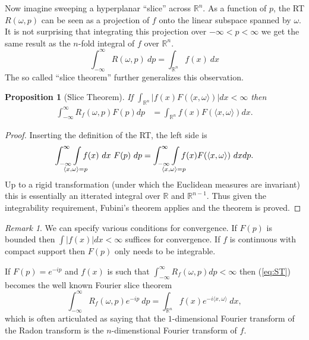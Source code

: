 \documentclass{amsart}
\newtheorem{proposition}[theorem]{Proposition}
\theoremstyle{remark}
\newtheorem{remark}[theorem]{Remark}
\numberwithin{equation}{section}
\newcommand{\RR}{\mathbb{R}}
\def\mclimits_#1{\limits_{\mathclap{#1}}}
\begin{document}
Now imagine sweeping a hyperplanar ``slice'' across $\RR^n$. As a function of $p$, the RT $R(\omega, p)$ can be seen as a projection of $f$ onto the linear subspace spanned by $\omega$. It is not surprising that integrating this projection over $-\infty < p < \infty$ we get the same result as the $n$-fold integral of $f$ over $\RR^n$.
\[
    \int_{-\infty}^\infty R(\omega, p) ~dp = \int_{\RR^n} f(x) ~dx
\]
The so called ``slice theorem'' further generalizes this observation.
\begin{proposition}[Slice Theorem]
    If $\int_{\mathbb{R}^n} |f(x) F(\langle x, \omega \rangle)| dx < \infty$ then
    \begin{align}
        \label{eq:ST}
        \int_{-\infty}^\infty R_f(\omega, p) F(p) dp 
        &= \int_{\mathbb{R}^n} f(x) F(\langle x, \omega \rangle) dx.
    \end{align}
\end{proposition}

\begin{proof}
Inserting the definition of the RT, the left side is
\[
    \int_{-\infty}^\infty \int\mclimits_{\langle x, \omega \rangle = p} f(x) ~dx~ F(p) ~dp 
    = \int_{-\infty}^\infty \int\mclimits_{\langle x, \omega \rangle = p} f(x) F(\langle x, \omega \rangle) ~dx dp.
\]
Up to a rigid transformation (under which the Euclidean measures are invariant) this is essentially an itterated integral over $\RR$ and $\RR^{n-1}$. Thus given the integrability requirement, Fubini's theorem applies and the theorem is proved.
\end{proof}

\begin{remark}
We can specify various conditions for convergence. If $F(p)$ is bounded then $\int |f(x)| dx < \infty$ suffices for convergence. If $f$ is continuous with compact support then $F(p)$ only needs to be integrable.  
\end{remark}

If $F(p) = e^{-ip}$ and $f(x)$ is such that $\int_{-\infty}^\infty R_f(\omega, p) dp < \infty$ then (\ref{eq:ST}) becomes the well known Fourier slice theorem
\[
    \int_{-\infty}^\infty R_f(\omega, p) e^{-ip} ~dp
    = \int_{\mathbb{R}^n} f(x) e^{-i\langle x, \omega\rangle} ~dx,
\]
which is often articulated as saying that the $1$-dimensional Fourier transform of the Radon transform is the $n$-dimenstional Fourier transform of $f$.
\end{document}
